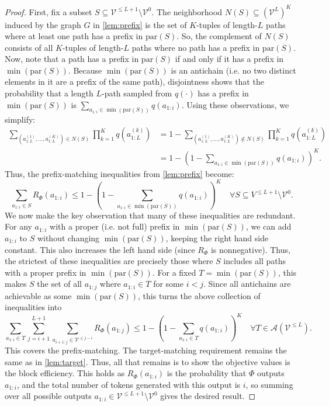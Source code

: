 \documentclass{article}
\theoremstyle{plain}
\theoremstyle{definition}
\theoremstyle{remark}
\newcommand{\V}{\mathcal{V}}
\newcommand{\pa}{\text{par}}
\begin{document}
\begin{proof}
First, fix a subset $S \subseteq \V^{\leq L+1} \setminus \V^0$. The neighborhood $N(S) \subseteq (\V^L)^K$ induced by the graph $G$ in \cref{lem:prefix} is the set of $K$-tuples of length-$L$ paths where at least one path has a prefix in $\pa(S)$. So, the complement of $N(S)$ consists of all $K$-tuples of length-$L$ paths where no path has a prefix in $\pa(S)$. Now, note that a path has a prefix in $\pa(S)$ if and only if it has a prefix in $\min(\pa(S))$. Because $\min(\pa(S))$ is an antichain (i.e. no two distinct elements in it are a prefix of the same path), disjointness shows that the probability that a length $L$-path sampled from $q(\cdot)$ has a prefix in $\min(\pa(S))$ is $\sum_{a_{1:i} \in \min(\pa(S))} q(a_{1:i})$. Using these observations, we simplify:
\begin{align}
    \sum_{\left(a^{(1)}_{1:L},\ldots,a^{(K)}_{1:L}\right) \in N(S)}  \prod_{k=1}^K q\left(a^{(k)}_{1:L}\right)
    &= 1 - \sum_{\left(a^{(1)}_{1:L},\ldots,a^{(K)}_{1:L}\right) \not \in N(S)}\prod_{k=1}^K q\left(a^{(k)}_{1:L}\right) \\
    &= 1 - \left(1 - \sum_{a_{1:i} \in \min(\pa(S))} q(a_{1:i})\right)^K.
\end{align}
Thus, the prefix-matching inequalities from \cref{lem:prefix} become:
\begin{equation}
    \sum_{a_{1:i} \in S} R_\Phi(a_{1:i}) \leq 1 - \left(1 - \sum_{a_{1:i} \in \min(\pa(S))} q(a_{1:i})\right)^K \quad \forall S \subseteq V^{\leq L+1} \setminus \V^0.
\end{equation}
We now make the key observation that many of these inequalities are redundant. For any $a_{1:i}$ with a proper (i.e. not full) prefix in $\min(\pa(S))$, we can add $a_{1:i}$ to $S$ without changing $\min(\pa(S))$, keeping the right hand side constant. This also increases the left hand side (since $R_\Phi$ is nonnegative). Thus, the strictest of these inequalities are precisely those where $S$ includes all paths with a proper prefix in $\min(\pa(S))$. For a fixed $T=\min(\pa(S))$, this makes $S$ the set of all $a_{1:j}$ where $a_{1:i} \in T$ for some $i<j$. Since all antichains are achievable as some $\min(\pa(S))$, this turns the above collection of inequalities into 
\begin{equation}
    \sum_{a_{1:i} \in T} \sum_{j=i+1}^{L+1} \sum_{a_{i+1:j} \in \V^{\leq j-i}} R_\Phi(a_{1:j}) \leq 1 - \left(1 - \sum_{a_{1:i} \in T} q(a_{1:i})\right)^K \quad \forall T \in \mathcal{A}(\V^{\leq L}).
\end{equation}
This covers the prefix-matching. The target-matching requirement remains the same as in \cref{lem:target}. Thus, all that remains is to show the objective values is the block efficiency. This holds as $R_\Phi(a_{1:i})$ is the probability that $\Phi$ outputs $a_{1:i}$, and the total number of tokens generated with this output is $i$, so summing over all possible outputs $a_{1:i} \in \V^{\leq L+1} \setminus \V^0$ gives the desired result.
\end{proof}
\end{document}
